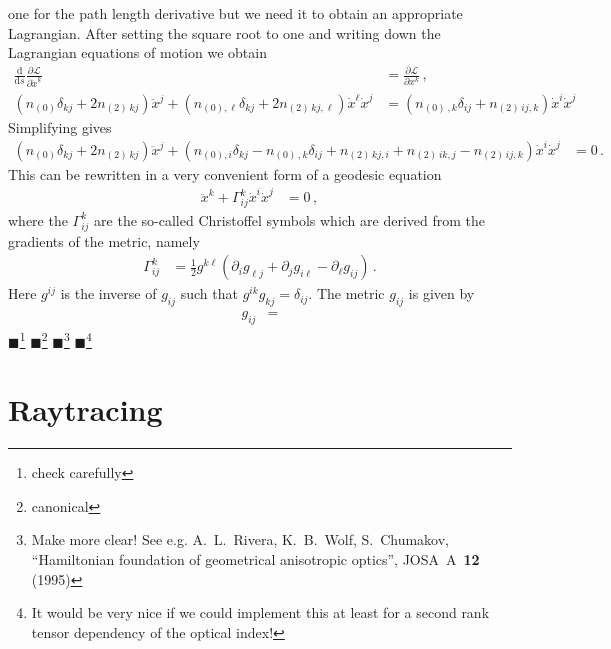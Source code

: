 \documentclass[12pt,a4paper,twoside,openright,BCOR10mm,headsepline,titlepage,abstracton,chapterprefix,final]{scrreprt}
\newcommand{\remark}[1]{{\color{red}$\blacksquare$}\footnote{{\color{red}#1}}}
\begin{document}
one for the path length derivative but we need it to obtain an appropriate Lagrangian. After setting the square root to one and writing down
the Lagrangian equations of motion we obtain
\begin{align}
  \frac{\text{d}}{\text{d}s} \frac{\partial \mathcal{L}}{\partial \dot{x}^k} &= \frac{\partial \mathcal{L}}{\partial x^k}\,,\nonumber\\
  (n_{(0)} \delta_{kj} + 2 n_{(2)\,kj}) \ddot{x}^j + (n_{(0),\ell} \delta_{kj} + 2 n_{(2)\,kj,\ell}) \dot{x}^\ell \dot{x}^j &= 
  (n_{(0)\,,k} \delta_{ij} + n_{(2)\,ij,k}) \dot{x}^i \dot{x}^j 
\end{align}
Simplifying gives
\begin{align}
 (n_{(0)} \delta_{kj} + 2 n_{(2)\,kj}) \ddot{x}^j + (n_{(0),i} \delta_{kj} - n_{(0)\,,k} \delta_{ij} + n_{(2)\,kj,i} + n_{(2)\,ik,j} - n_{(2)\,ij,k}) \dot{x}^i \dot{x}^j &=0\,. 
\end{align}
This can be rewritten in a very convenient form of a geodesic equation
\begin{align}
 \ddot{x}^k + \Gamma^k_{ij} \dot{x}^i \dot{x}^j &= 0\,,
\end{align}
where the $\Gamma^k_{ij}$ are the so-called Christoffel symbols which are derived from the gradients of the metric, namely
\begin{align}
 \Gamma^k_{ij} &= \frac{1}{2} g^{k\ell} \left(\partial_i g_{\ell j} + \partial_j g_{i \ell} - \partial_\ell g_{ij}\right)\,.
\end{align}
Here $g^{ij}$ is the inverse of $g_{ij}$ such that $g^{ik} g_{kj} = \delta_{ij}$. The metric $g_{ij}$ is given by
\begin{align}
 g_{ij} &= 
\end{align}
\remark{check carefully}
\remark{canonical}
\remark{Make more clear! See e.g. A.~L.~Rivera, K.~B.~Wolf, S.~Chumakov, ``Hamiltonian foundation of geometrical anisotropic optics'', JOSA~A~{\bf 12} (1995)}
\remark{It would be very nice if we could implement this at least for a second rank tensor dependency of the optical index!}


\chapter{Raytracing}
\end{document}
